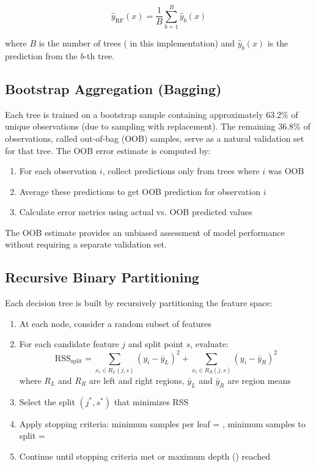 \begin{equation}
\hat{y}_{\text{RF}}(x) = \frac{1}{B} \sum_{b=1}^{B} \hat{y}_b(x)
\end{equation}

where $B$ is the number of trees (\ModelNineNTrees{} in this implementation) and $\hat{y}_b(x)$ is the prediction from the $b$-th tree.

\subsection{Bootstrap Aggregation (Bagging)}

Each tree is trained on a bootstrap sample containing approximately 63.2\% of unique observations (due to sampling with replacement). The remaining 36.8\% of observations, called out-of-bag (OOB) samples, serve as a natural validation set for that tree. The OOB error estimate is computed by:

\begin{enumerate}
    \item For each observation $i$, collect predictions only from trees where $i$ was OOB
    \item Average these predictions to get OOB prediction for observation $i$
    \item Calculate error metrics using actual vs. OOB predicted values
\end{enumerate}

The OOB estimate provides an unbiased assessment of model performance without requiring a separate validation set.

\subsection{Recursive Binary Partitioning}

Each decision tree is built by recursively partitioning the feature space:

\begin{enumerate}
    \item At each node, consider a random subset of \ModelNineMaxFeatures{} features
    \item For each candidate feature $j$ and split point $s$, evaluate:
    \begin{equation}
    \text{RSS}_{\text{split}} = \sum_{x_i \in R_L(j,s)} (y_i - \bar{y}_L)^2 + \sum_{x_i \in R_R(j,s)} (y_i - \bar{y}_R)^2
    \end{equation}
    where $R_L$ and $R_R$ are left and right regions, $\bar{y}_L$ and $\bar{y}_R$ are region means
    \item Select the split $(j^*, s^*)$ that minimizes RSS
    \item Apply stopping criteria: minimum samples per leaf = \ModelNineMinSamplesLeaf{}, minimum samples to split = \ModelNineMinSamplesSplit{}
    \item Continue until stopping criteria met or maximum depth (\ModelNineMaxDepth{}) reached
\end{enumerate}


